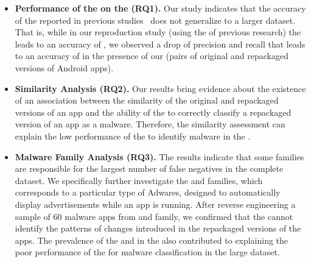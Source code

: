\begin{itemize}
\item \textbf{Performance of the \mas on the \cds (RQ1).} 
  Our study indicates that the accuracy of the \mas reported in
  previous studies~\cite{DBLP:conf/wcre/BaoLL18,DBLP:journals/jss/CostaMMSSBNR22} does not
  generalize to a larger dataset. That is, while in our
  reproduction study (using the \sds of previous research) the \mas
  leads to an accuracy of \fscoreSmall, we observed a drop of precision and recall
  that leads to an accuracy of \fscore in the presence of our \cds (\apps pairs of
  original and repackaged versions of Android apps). 


\item \textbf{Similarity Analysis (RQ2).} Our results bring evidence about the existence of an association between the similarity of the original and repackaged versions of an app and the ability of the \mas to correctly classify a repackaged version of an app as a malware. Therefore, the similarity assessment can explain the low performance of the \mas to identify malware in the \cds.

\item \textbf{Malware Family Analysis (RQ3).} The results indicate that some families are responsible for the largest number of false negatives in the complete dataset. We specifically further investigate the \gps and \rmb families, which corresponds to a particular type of Adwares, designed to automatically display advertisements while an app is running. After reverse engineering a sample of 60 malware apps from \gps and \rmb family, we confirmed that the \mas cannot identify the patterns of changes introduced in the repackaged versions of the apps. The prevalence of the \gps and \rmb in the \cds also contributed to explaining the poor performance of the \mas for malware classification in the large dataset.


\end{itemize}


